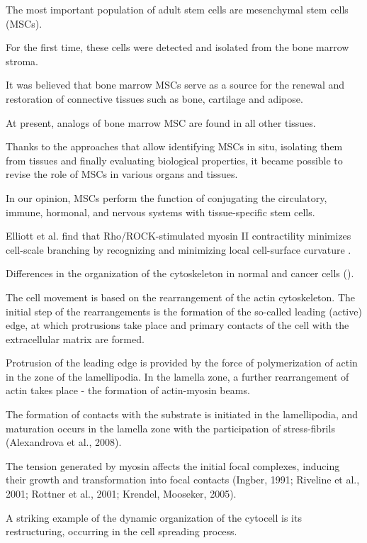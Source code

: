 \documentclass[english,authoryear]{elsarticle}
\begin{document}
The most important population of adult stem cells are mesenchymal stem cells (MSCs).

For the first time, these cells were detected and isolated from the bone marrow stroma.

It was believed that bone marrow MSCs serve as a source for the renewal and restoration of connective tissues such as bone, cartilage and adipose.

At present, analogs of bone marrow MSC are found in all other tissues.

Thanks to the approaches that allow identifying MSCs in situ, isolating them from tissues and finally evaluating biological properties, it became possible to revise the role of MSCs in various organs and tissues.

In our opinion, MSCs perform the function of conjugating the circulatory, immune, hormonal, and nervous systems with tissue-specific stem cells.


Elliott et al. find that Rho/ROCK-stimulated myosin II contractility minimizes cell-scale branching by recognizing and minimizing local cell-surface curvature \cite{elliott2015myosin}.

Differences in the organization of the cytoskeleton in normal and cancer cells (\cite{shutova2010normal}).

The cell movement is based on the rearrangement of the actin cytoskeleton. The initial step of the rearrangements is the formation of the so-called leading (active) edge, at which protrusions take place and primary contacts of the cell with the extracellular matrix are formed.

Protrusion of the leading edge is provided by the force of polymerization of actin in the zone of the lamellipodia. In the lamella zone, a further rearrangement of actin takes place - the formation of actin-myosin beams.

The formation of contacts with the substrate is initiated in the lamellipodia, and maturation occurs in the lamella zone with the participation of stress-fibrils (Alexandrova et al., 2008).


The tension generated by myosin affects the initial focal complexes, inducing their growth and transformation into focal contacts (Ingber, 1991; Riveline et al., 2001; Rottner et al., 2001; Krendel, Mooseker, 2005).


A striking example of the dynamic organization of the cytocell is its restructuring, occurring in the cell spreading process.
\end{document}
